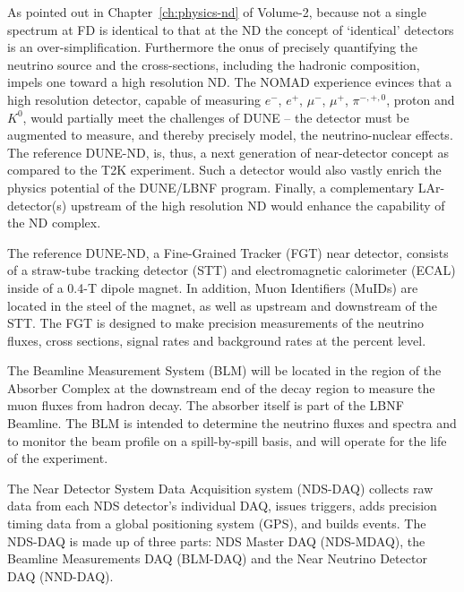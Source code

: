 As pointed out in Chapter~\ref{ch:physics-nd} of Volume-2, because 
not a single spectrum at FD is identical to that at the ND the concept of `identical' detectors 
is an over-simplification.  Furthermore the onus of precisely quantifying the neutrino 
source and the cross-sections, including the hadronic composition, impels one toward 
a high resolution ND. The NOMAD experience evinces that a high resolution detector,  
capable of measuring $e^{-}$, $e^{+}$, $\mu^{-}$, $\mu^{+}$, $\pi^{-,+,0}$, proton and $K^{0}$, 
would  partially meet the challenges of DUNE -- the detector must be augmented to measure, and thereby 
precisely model,  the neutrino-nuclear effects. The reference DUNE-ND, is, thus,  a next generation 
of near-detector concept as compared to the T2K experiment. Such a detector would also 
vastly enrich the physics potential of the DUNE/LBNF program. 
Finally, a complementary LAr-detector(s) upstream of the high resolution ND would enhance 
the capability of the ND complex. 


The reference DUNE-ND, a  Fine-Grained Tracker (FGT) near detector,  consists of a straw-tube
tracking detector (STT) and electromagnetic calorimeter (ECAL) inside of a 0.4-T
dipole magnet. In addition, Muon Identifiers (MuIDs) are located in the
steel of the magnet, as well as upstream and downstream of the STT. The FGT
is designed to make precision measurements of the neutrino fluxes, 
cross sections, signal rates and background rates at the percent level. 

The Beamline Measurement System (BLM) will be located in the region of the Absorber Complex at 
the downstream end of the decay region to measure the muon fluxes from hadron decay. The 
absorber itself is part of the LBNF Beamline. 
The BLM is intended to determine the neutrino fluxes and spectra
and to monitor the beam profile on a spill-by-spill basis, and will operate for the life of the
experiment. 

The Near Detector System Data Acquisition system (NDS-DAQ) collects raw data from each NDS detector's
individual DAQ, issues triggers, adds precision timing 
data from a global positioning system (GPS), and builds events. 
The NDS-DAQ is made up of three parts: NDS Master DAQ (NDS-MDAQ), the Beamline Measurements 
DAQ (BLM-DAQ) and the Near Neutrino Detector DAQ (NND-DAQ).





